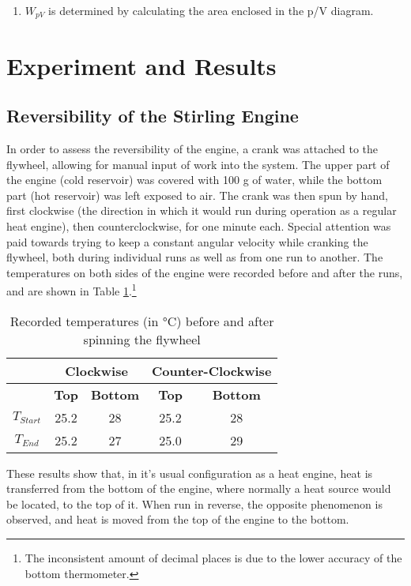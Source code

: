 \documentclass[titlepage]{article}
\begin{document}
\begin{enumerate}
    \item \(W_{pV}\) is determined by calculating the area enclosed in the p/V diagram.
\end{enumerate}


\newpage
\section{Experiment and Results}

\subsection{Reversibility of the Stirling Engine}
In order to assess the reversibility of the engine, a crank was attached to the flywheel, allowing for manual input of work into the system. The upper part of the engine (cold reservoir) was covered with 100 g of water, while the bottom part (hot reservoir) was left exposed to air.
The crank was then spun by hand, first clockwise (the direction in which it would run during operation as a regular heat engine), then counterclockwise, for one minute each. Special attention was paid towards trying to keep a constant angular velocity while cranking the flywheel, both during individual runs as well as from one run to another.
The temperatures on both sides of the engine were recorded before and after the runs, and are shown in Table \ref{tb_manual_temps}.\footnote{The inconsistent amount of decimal places is due to the lower accuracy of the bottom thermometer.}

\begin{table}[H]
    \centering
    \caption{Recorded temperatures (in °C) before and after spinning the flywheel}
    \label{tb_manual_temps}
    \begin{tabular}{|c|c|c|c|c|}
        \hline
        & \multicolumn{2}{|c|}{\textbf{Clockwise}} & \multicolumn{2}{|c|}{\textbf{Counter-Clockwise}}
        \\
        \hline
        & \textbf{Top} & \textbf{Bottom} & \textbf{Top} & \textbf{Bottom}
        \\
        \hline
        \(T_{Start}\) & 25.2 & 28 & 25.2 & 28
        \\
        \hline
        \(T_{End}\) & 25.2 & 27 & 25.0 & 29
        \\
        \hline
    \end{tabular}
\end{table}
%
\noindent These results show that, in it's usual configuration as a heat engine, heat is transferred from the bottom of the engine, where normally a heat source would be located, to the top of it. When run in reverse, the opposite phenomenon is observed, and heat is moved from the top of the engine to the bottom.
\end{document}

